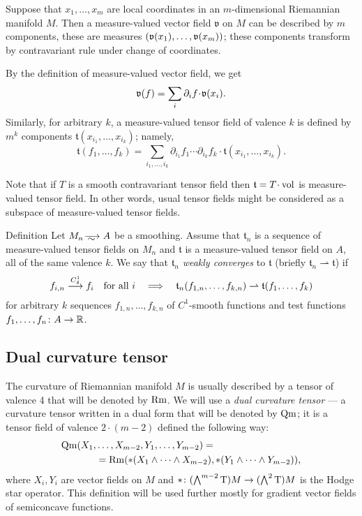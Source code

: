 Suppose that $x_1,\dots,x_m$ are local coordinates in an $m$-dimensional Riemannian manifold $M$.
Then a measure-valued vector field $\mathfrak{v}$ on $M$ can be described by $m$ components, these are measures $(\vv(x_1),\zz\dots,\vv(x_m))$;
these components transform by contravariant rule under change of coordinates.

By the definition of measure-valued vector field, we get
\[\mathfrak{v}(f)=\sum_{i}\partial_i f\cdot \vv(x_i).\]
Similarly, for arbitrary $k$, a measure-valued tensor field of valence $k$ is defined by $m^k$ components 
$\mathfrak{t}(x_{i_1},\dots,x_{i_k})$; namely,
\[\mathfrak{t}(f_1,\dots,f_k)
=
\sum_{i_1,\dots,i_k}
\partial_{i_1} f_1 
\cdots 
\partial_{i_k} f_k
\cdot \mathfrak{t}(x_{i_1},\dots,x_{i_k}).\]

Note that if $T$ is a smooth contravariant tensor field then $\mathfrak{t}=T\cdot \vol$ is measure-valued tensor field.
In other words, usual tensor fields might be considered as a subspace of measure-valued tensor fields.

\begin{rdef}{Definition}
Let $M_n\smooths{} A$ be a smoothing.
Assume that $\mathfrak{t}_n$ is a sequence of %
 measure-valued tensor fields on $M_n$  and $\mathfrak{t}$ is a
measure-valued tensor field on $A$,
all of the same valence $k$.
We say that $\mathfrak{t}_n$ \emph{weakly converges} to  $\mathfrak{t}$
(briefly $\mathfrak{t}_n\rightharpoonup\mathfrak{t}$) if
\[f_{i,n}\smoothto f_i\quad\text{for all\ } i
\quad\Longrightarrow\quad
\mathfrak{t}_n(f_{1,n},\dots,f_{k,n})\zz\rightharpoonup\mathfrak{t}(f_{1},\dots,f_{k})\]
for arbitrary $k$ sequences $f_{1,n},\dots,f_{k,n}$ of $C^1$-smooth functions and test functions $f_1,\dots,f_n\colon A\to\mathbb{R}$.
\end{rdef}

\subsection{Dual curvature tensor}

The curvature of Riemannian manifold $M$ is usually described by a tensor of valence 4 that will be denoted by $\operatorname{\rm Rm}$.
We will use a \emph{dual curvature tensor} --- 
a curvature tensor written in a dual form that will be denoted by $\operatorname{\rm Qm}$;
it is a tensor field of valence $2\cdot(m-2)$ defined the following way:
\begin{align*}
\operatorname{\rm Qm}(X_1,&\dots,X_{m-2},Y_1,\dots,Y_{m-2})
= 
\\
&=
\operatorname{\rm Rm}(*(X_1\wedge\dots\wedge X_{m-2}),*(Y_1\wedge\dots\wedge Y_{m-2})),
\end{align*}
where $X_i,Y_i$ are vector fields on $M$ and  ${*}\:(\bigwedge^{m-2}\T)M\zz\to(\bigwedge^2\T)M$ is the  Hodge star operator.
This definition will be used further mostly for gradient vector fields of semiconcave functions.

